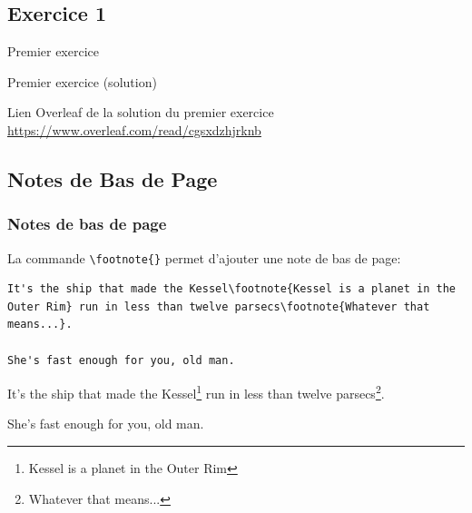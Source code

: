 \subsection{Exercice 1}

\begin{frame}[fragile]{Premier exercice}
  \begin{center}
  \end{center}
\end{frame}

\begin{frame}[fragile]{Premier exercice (solution)}
  \begin{center}
  Lien Overleaf de la solution du premier exercice \url{https://www.overleaf.com/read/cgsxdzhjrknb}
  \end{center}
\end{frame}


\subsection{Notes de Bas de Page}

\begin{frame}[fragile]
  \frametitle{Notes de bas de page}
  La commande \lstinline|\footnote{}| permet d'ajouter une note de bas de page:
  \begin{lstlisting}[style=nonumbers]
It's the ship that made the Kessel\footnote{Kessel is a planet in the Outer Rim} run in less than twelve parsecs\footnote{Whatever that means...}.

She's fast enough for you, old man.
  \end{lstlisting}
  \begin{minipage}{\textwidth}
    It's the ship that made the Kessel\footnote{Kessel is a planet in the Outer Rim} run in less than twelve parsecs\footnote{Whatever that means...}.

    She's fast enough for you, old man.
  \end{minipage}
\end{frame}

